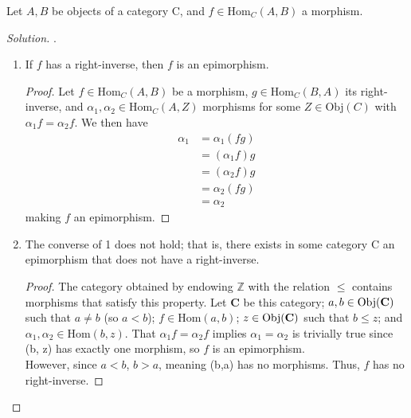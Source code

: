 \documentclass[12pt]{article}
\newenvironment{problem}[2][Problem]{\begin{trivlist}
\item[\hskip \labelsep {\bfseries #1}\hskip \labelsep {\bfseries #2.}]}{\end{trivlist}}
\newcommand{\catname}[1]{\normalfont\textbf{#1}}
\newcommand{\Hom}{\text{Hom}}
\newcommand{\Obj}[1]{\text{Obj}(\catname{C})}
\newenvironment{solution}
  {\renewcommand\qedsymbol{$\blacksquare$}\begin{proof}[Solution]}
{\end{proof}}
\newenvironment{sproof}{%
  \renewcommand\qedsymbol{$\square$}
  \begin{proof}
  }{
  \end{proof}
}
\begin{document}
\begin{problem}{4.3}
  Let $A,B$ be objects of a category C, and $f\in \text{Hom}_C(A,B)$ a morphism.
\end{problem}
\begin{solution}.
  \begin{enumerate}
    \item If $f$ has a right-inverse, then $f$ is an epimorphism.
      \begin{sproof}
        Let $f\in \text{Hom}_C(A,B)$ be a morphism, $g\in \text{Hom}_C(B,A)$ its right-inverse, and $\alpha_1, \alpha_2 \in \text{Hom}_C(A,Z)$ morphisms for some $Z\in \text{Obj}(C)$ with $\alpha_1f=\alpha_2f$.
        We then have
        \begin{align*}
          \alpha_1 &= \alpha_1(fg)\\
          &= (\alpha_1f)g\\
          &= (\alpha_2f)g\\
          &= \alpha_2(fg)\\
          &= \alpha_2
        \end{align*}
        making $f$ an epimorphism.
      \end{sproof}
    \item The converse of 1 does not hold; that is, there exists in some category C an epimorphism that does not have a right-inverse.
      \begin{sproof}
        The category obtained by endowing $\mathbb{Z}$ with the relation $\leq$ contains morphisms that satisfy this property.
        Let \catname{C} be this category; $a, b \in \Obj{C}$ such that $a\neq b$ (so $a < b$); $f \in \Hom(a, b)$; $z \in \Obj{C}$ such that $b \leq z$; and $\alpha_1, \alpha_2 \in \Hom(b, z)$. 
        That $\alpha_1f = \alpha_2f$ implies $\alpha_1=\alpha_2$ is trivially true since \Hom(b, z) has exactly one morphism, so $f$ is an epimorphism. \\
        However, since $a < b$, $b > a$, meaning \Hom(b,a) has no morphisms. Thus, $f$ has no right-inverse.

      \end{sproof}
  \end{enumerate}
\end{solution}

\newpage
\end{document}
